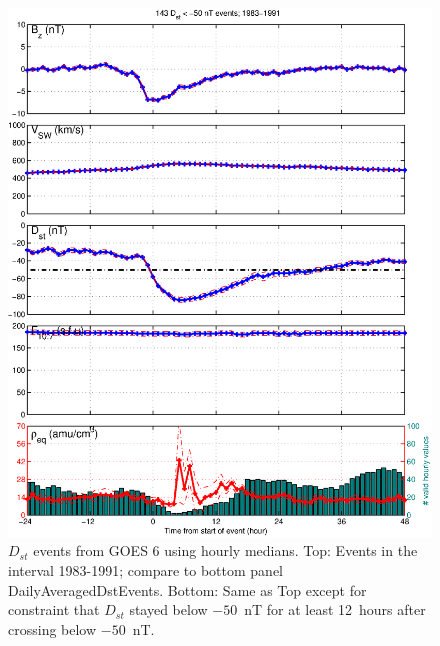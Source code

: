 \documentclass[10pt,twocolumn]{article}
\begin{document}
\begin{figure}[tp!]
\includegraphics[scale=0.40]{paperfigures/stormavs-dd12-GOES6.eps}
\caption{$D_{st}$ events from GOES 6 using hourly medians. Top: Events in the interval 1983-1991; compare to bottom panel {DailyAveragedDstEvents}. Bottom: Same as Top except for constraint that $D_{st}$ stayed below $-50$~nT for at least 12~hours after crossing below $-50$~nT.}
\label{HourlyAveragedDstEvents}
\end{figure}

\clearpage
\end{document}
